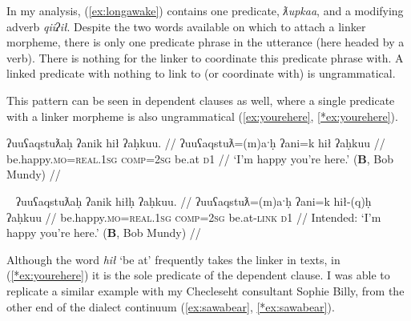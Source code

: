 In my analysis, (\ref{ex:longawake}) contains one predicate, \textit{ƛupkaa}, and a modifying adverb \textit{qiiʔił}. Despite the two words available on which to attach a linker morpheme, there is only one predicate phrase in the utterance (here headed by a verb). There is nothing for the linker to coordinate this predicate phrase with. A linked predicate with nothing to link to (or coordinate with) is ungrammatical.


This pattern can be seen in dependent clauses as well, where a single predicate with a linker morpheme is also ungrammatical (\ref{ex:yourehere}, \ref{*ex:yourehere}).

\ex \label{ex:yourehere}
\begingl
\glpreamble ʔuuʕaqstuƛaḥ ʔanik hił ʔaḥkuu. //
\gla ʔuuʕaqstuƛ=(m)aˑḥ ʔani=k hił ʔaḥkuu //
\glb be.happy.\textsc{mo}=\textsc{real.1sg} \textsc{comp}=\textsc{2sg} be.at \textsc{d1} //
\glft `I'm happy you're here.' (\textbf{B}, Bob Mundy) //
\endgl
\xe

\ex~ \label{*ex:yourehere}
\begingl
\glpreamble *ʔuuʕaqstuƛaḥ ʔanik hiłḥ ʔaḥkuu. //
\gla ʔuuʕaqstuƛ=(m)aˑḥ ʔani=k hił-(q)ḥ ʔaḥkuu //
\glb be.happy.\textsc{mo}=\textsc{real.1sg} \textsc{comp}=\textsc{2sg} be.at-\textsc{link} \textsc{d1} //
\glft Intended: `I'm happy you're here.' (\textbf{B}, Bob Mundy) //
\endgl
\xe

Although the word \textit{hił} `be at' frequently takes the linker in texts, in (\ref{*ex:yourehere}) it is the sole predicate of the dependent clause. I was able to replicate a similar example with my Checleseht consultant Sophie Billy, from the other end of the dialect continuum (\ref{ex:sawabear}, \ref{*ex:sawabear}).


